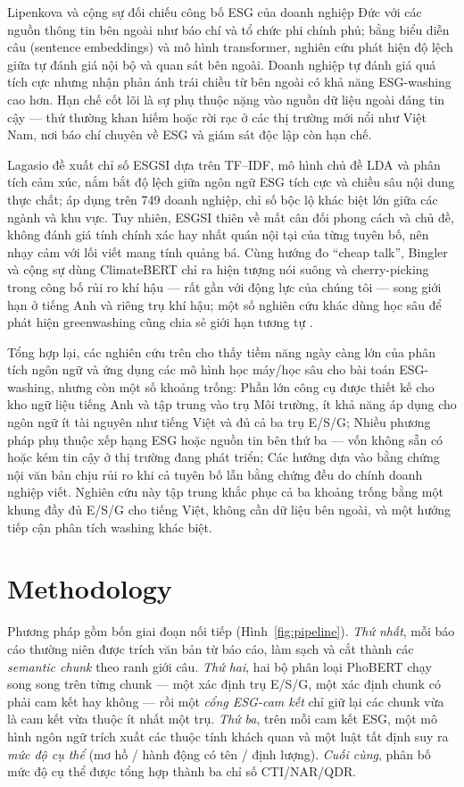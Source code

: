 \documentclass[runningheads]{llncs}
\begin{document}
Lipenkova và cộng sự \cite{lipenkova2023detecting} đối chiếu công bố ESG của doanh nghiệp Đức với các nguồn thông tin bên ngoài như báo chí và tổ chức phi chính phủ; bằng biểu diễn câu (sentence embeddings) và mô hình transformer, nghiên cứu phát hiện độ lệch giữa tự đánh giá nội bộ và quan sát bên ngoài. Doanh nghiệp tự đánh giá quá tích cực nhưng nhận phản ánh trái chiều từ bên ngoài có khả năng ESG-washing cao hơn. Hạn chế cốt lõi là sự phụ thuộc nặng vào nguồn dữ liệu ngoài đáng tin cậy --- thứ thường khan hiếm hoặc rời rạc ở các thị trường mới nổi như Việt Nam, nơi báo chí chuyên về ESG và giám sát độc lập còn hạn chế.

Lagasio \cite{lagasio2024esg} đề xuất chỉ số ESGSI dựa trên TF--IDF, mô hình chủ đề LDA và phân tích cảm xúc, nắm bắt độ lệch giữa ngôn ngữ ESG tích cực và chiều sâu nội dung thực chất; áp dụng trên 749 doanh nghiệp, chỉ số bộc lộ khác biệt lớn giữa các ngành và khu vực. Tuy nhiên, ESGSI thiên về mất cân đối phong cách và chủ đề, không đánh giá tính chính xác hay nhất quán nội tại của từng tuyên bố, nên nhạy cảm với lối viết mang tính quảng bá. Cùng hướng đo ``cheap talk'', Bingler và cộng sự \cite{bingler2022cheap} dùng ClimateBERT chỉ ra hiện tượng nói suông và cherry-picking trong công bố rủi ro khí hậu --- rất gần với động lực của chúng tôi --- song giới hạn ở tiếng Anh và riêng trụ khí hậu; một số nghiên cứu khác dùng học sâu để phát hiện greenwashing cũng chia sẻ giới hạn tương tự \cite{zhao2023detecting}.

Tổng hợp lại, các nghiên cứu trên cho thấy tiềm năng ngày càng lớn của phân tích ngôn ngữ và ứng dụng các mô hình học máy/học sâu cho bài toán ESG-washing, nhưng còn một số khoảng trống: Phần lớn công cụ được thiết kế cho kho ngữ liệu tiếng Anh và tập trung vào trụ Môi trường, ít khả năng áp dụng cho ngôn ngữ ít tài nguyên như tiếng Việt và đủ cả ba trụ E/S/G; Nhiều phương pháp phụ thuộc xếp hạng ESG hoặc nguồn tin bên thứ ba --- vốn không sẵn có hoặc kém tin cậy ở thị trường đang phát triển; Các hướng dựa vào bằng chứng nội văn bản chịu rủi ro khi cả tuyên bố lẫn bằng chứng đều do chính doanh nghiệp viết. Nghiên cứu này tập trung khắc phục cả ba khoảng trống bằng một khung đầy đủ E/S/G cho tiếng Việt, không cần dữ liệu bên ngoài, và một hướng tiếp cận phân tích washing khác biệt.

\section{Methodology}
Phương pháp gồm bốn giai đoạn nối tiếp (Hình~\ref{fig:pipeline}). \emph{Thứ nhất}, mỗi báo cáo thường niên được trích văn bản từ báo cáo, làm sạch và cắt thành các \emph{semantic chunk} theo ranh giới câu. \emph{Thứ hai}, hai bộ phân loại PhoBERT chạy song song trên từng chunk --- một xác định trụ E/S/G, một xác định chunk có phải cam kết hay không --- rồi một \emph{cổng ESG-cam kết} chỉ giữ lại các chunk vừa là cam kết vừa thuộc ít nhất một trụ. \emph{Thứ ba}, trên mỗi cam kết ESG, một mô hình ngôn ngữ trích xuất các thuộc tính khách quan và một luật tất định suy ra \emph{mức độ cụ thể} (mơ hồ / hành động có tên / định lượng). \emph{Cuối cùng}, phân bố mức độ cụ thể được tổng hợp thành ba chỉ số CTI/NAR/QDR.
\end{document}
